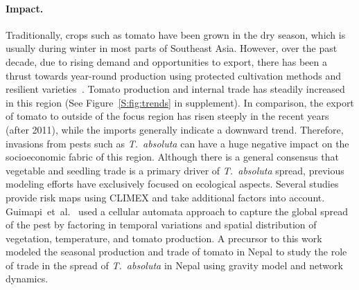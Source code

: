 \documentclass[11pt]{article}
\newcommand{\tuta}{\emph{T.~absoluta}}
\theoremstyle{definition}
\begin{document}
\paragraph{Impact.} Traditionally, crops such as tomato have been grown in
the dry season, which is usually during winter in most parts of Southeast
Asia. However, over the past decade, due to rising demand and opportunities
to export, there has been a thrust towards year-round production using
protected cultivation methods and resilient varieties~\cite{ali2001}.
Tomato production and internal trade has steadily increased in this region
(See Figure~\ref{S:fig:trends} in supplement). In comparison, the export of
tomato to outside of the focus region has risen steeply in the recent years
(after 2011), while the imports generally indicate a downward trend.
Therefore, invasions from pests such as \tuta{} can have a huge negative
impact on the socioeconomic fabric of this region.  Although there is a
general consensus that vegetable and seedling trade is a primary driver of
\tuta{} spread, previous modeling efforts have exclusively focused on
ecological aspects. Several
studies~\cite{desneux2010biological,tonnang2015identification} provide risk
maps using CLIMEX and take additional factors into account.
Guimapi~et~al.~\cite{guimapi2016modeling} used a cellular automata approach
to capture the global spread of the pest by factoring in temporal
variations and spatial distribution of vegetation, temperature, and tomato
production. A precursor to this work~\cite{venkatramanan2017towards}
modeled the seasonal production and trade of tomato in Nepal to study the
role of trade in the spread of \tuta{} in Nepal using gravity model and
network dynamics.

\end{document}
